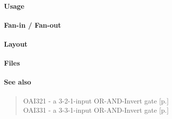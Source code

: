 \paragraph{Usage}

\paragraph{Fan-in / Fan-out}

\paragraph{Layout}

\paragraph{Files}

\paragraph{See also}
\begin{quote}
    OAI321 - a 3-2-1-input OR-AND-Invert gate [p.\pageref{OAI321}] \\
    OAI331 - a 3-3-1-input OR-AND-Invert gate [p.\pageref{OAI331}]
\end{quote}
